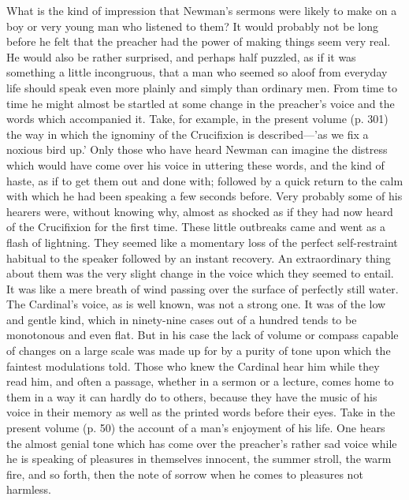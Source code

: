 What is the kind of impression that Newman's
sermons were likely to make on a boy or very young man who listened to
them? It would probably not be long before he felt that the preacher
had the power of making things seem very real. He would also be rather
surprised, and perhaps half puzzled, as if it was something a little
incongruous, that a man who seemed so aloof from everyday life should
speak even more plainly and simply than ordinary men. From time to
time he might almost be startled at some change in the preacher's
voice and the words which accompanied it. Take, for example, in the
present volume (p. 301) the way in which the ignominy of the
Crucifixion is described—'as we fix a noxious bird up.' Only those
who have heard Newman can imagine the distress which would have come
over his voice in uttering these words, and the kind of haste, as
if to get them out and done with; followed by a quick return to the
calm with which he had been speaking a few seconds before. Very
probably some of his hearers were, without knowing why, almost as
shocked as if they had now heard of the Crucifixion for the first
time. These little outbreaks came and went as a flash of lightning.
They seemed like a momentary loss of the perfect self-restraint
habitual to the speaker followed by an instant recovery. An
extraordinary thing about them was the very slight change in the voice
which they seemed to entail. It was like a mere breath of wind passing
over the surface of perfectly still water. The Cardinal's voice, as is
well known, was not a strong one. It was of the low and gentle kind,
which in ninety-nine cases out of a hundred tends to be monotonous and
even flat. But in his case the lack of volume or compass capable of
changes on a large scale was made up for by a purity of tone upon
which the faintest modulations told. Those who knew the Cardinal hear
him while they read him, and often a passage, whether in a sermon or a
lecture, comes home to them in a way it can hardly do to others,
because they have the music of his voice in their memory as well as
the printed words before their eyes. Take in the present volume (p.
50) the account of a man's enjoyment of his life. One hears the almost
genial tone which has come over the preacher's rather sad voice
while he is speaking of pleasures in themselves innocent, the summer
stroll, the warm fire, and so forth, then the note of sorrow when he
comes to pleasures not harmless.

